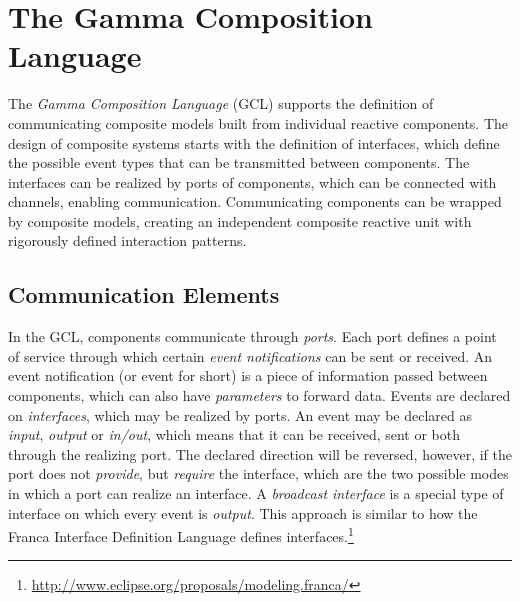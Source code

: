 %
%

\section{The Gamma Composition Language}
\label{sec:composition-language}
The \emph{Gamma Composition Language} (GCL) supports the definition of communicating composite models
built from individual reactive components. The design of composite systems starts with the definition of interfaces, which define the possible event types that can be transmitted between components. The interfaces can be realized by ports of components, which can be connected with channels, enabling communication. Communicating components can be wrapped by composite models, creating an independent composite reactive unit with rigorously defined interaction patterns.

\subsection{Communication Elements}
\label{sec:communication-elements}

In the GCL, components communicate through \emph{ports}. Each port defines a point of service through which certain \emph{event notifications} can be sent or received. An event notification (or event for short) is a piece of information passed between components, which can also have \emph{parameters} to forward data. Events are declared on \emph{interfaces}, which may be realized by ports. An event may be declared as \emph{input}, \emph{output} or \emph{in/out}, which means that it can be received, sent or both through the realizing port. The declared direction will be reversed, however, if the port does not \emph{provide}, but \emph{require} the interface, which are the two possible modes in which a port can realize an interface. A \emph{broadcast interface} is a special type of interface on which every event is \emph{output}. This approach is similar to how the Franca Interface Definition Language defines interfaces.\footnote{\url{http://www.eclipse.org/proposals/modeling.franca/}}

